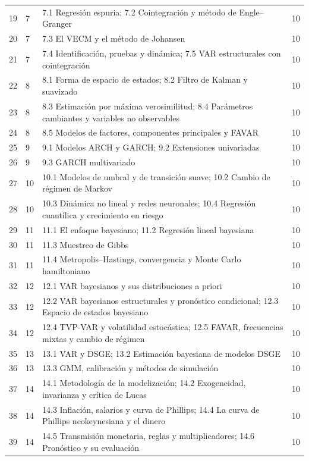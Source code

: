 \documentclass[11pt,a4paper]{article}
\begin{document}
{\begin{tabularx}{\textwidth}{clXc}
\midrule
19 & 7 & 7.1 Regresión espuria; 7.2 Cointegración y método de Engle--Granger & 10 \\
20 & 7 & 7.3 El VECM y el método de Johansen & 10 \\
21 & 7 & 7.4 Identificación, pruebas y dinámica; 7.5 VAR estructurales con cointegración & 10 \\
\midrule
22 & 8 & 8.1 Forma de espacio de estados; 8.2 Filtro de Kalman y suavizado & 10 \\
23 & 8 & 8.3 Estimación por máxima verosimilitud; 8.4 Parámetros cambiantes y variables no observables & 10 \\
24 & 8 & 8.5 Modelos de factores, componentes principales y FAVAR & 10 \\
\midrule
25 & 9 & 9.1 Modelos ARCH y GARCH; 9.2 Extensiones univariadas & 10 \\
26 & 9 & 9.3 GARCH multivariado & 10 \\
\midrule
27 & 10 & 10.1 Modelos de umbral y de transición suave; 10.2 Cambio de régimen de Markov & 10 \\
28 & 10 & 10.3 Dinámica no lineal y redes neuronales; 10.4 Regresión cuantílica y crecimiento en riesgo & 10 \\
\midrule
29 & 11 & 11.1 El enfoque bayesiano; 11.2 Regresión lineal bayesiana & 10 \\
30 & 11 & 11.3 Muestreo de Gibbs & 10 \\
31 & 11 & 11.4 Metropolis--Hastings, convergencia y Monte Carlo hamiltoniano & 10 \\
\midrule
32 & 12 & 12.1 VAR bayesianos y sus distribuciones a priori & 10 \\
33 & 12 & 12.2 VAR bayesianos estructurales y pronóstico condicional; 12.3 Espacio de estados bayesiano & 10 \\
34 & 12 & 12.4 TVP-VAR y volatilidad estocástica; 12.5 FAVAR, frecuencias mixtas y cambio de régimen & 10 \\
\midrule
35 & 13 & 13.1 VAR y DSGE; 13.2 Estimación bayesiana de modelos DSGE & 10 \\
36 & 13 & 13.3 GMM, calibración y métodos de simulación & 10 \\
\midrule
37 & 14 & 14.1 Metodología de la modelización; 14.2 Exogeneidad, invarianza y crítica de Lucas & 10 \\
38 & 14 & 14.3 Inflación, salarios y curva de Phillips; 14.4 La curva de Phillips neokeynesiana y el dinero & 10 \\
39 & 14 & 14.5 Transmisión monetaria, reglas y multiplicadores; 14.6 Pronóstico y su evaluación & 10 \\

\end{tabularx}}
\end{document}
